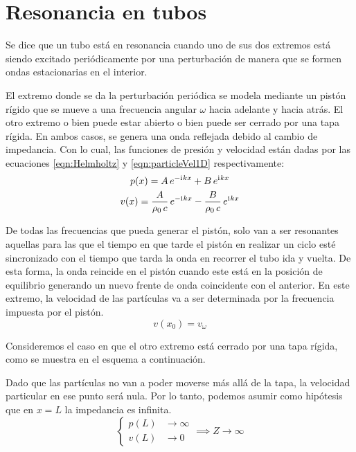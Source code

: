 \documentclass[a5paper,12pt,twoside]{book}
\begin{document}
\section{Resonancia en tubos}

Se dice que un tubo está en resonancia cuando uno de sus dos extremos está siendo excitado periódicamente por una perturbación de manera que se formen ondas estacionarias en el interior.

El extremo donde se da la perturbación periódica se modela mediante un pistón rígido que se mueve a una frecuencia angular $\omega$ hacia adelante y hacia atrás. El otro extremo o bien puede estar abierto o bien puede ser cerrado por una tapa rígida. En ambos casos, se genera una onda reflejada debido al cambio de impedancia. Con lo cual, las funciones de presión y velocidad están dadas por las ecuaciones \ref{eqn:Helmholtz} y \ref{eqn:particleVel1D} respectivamente:
\begin{gather}
    p(x) = A \, e^{-\mathrm{i}\mkern1mu k x} + B \, e^{\mathrm{i}\mkern1mu k x}
    \label{eqn:tubePressure}
    \\
    v(x) = \frac{A}{\rho_0 \, c} \, e^{-\mathrm{i}\mkern1mu k x} - \frac{B}{\rho_0 \, c} \, e^{\mathrm{i}\mkern1mu k x}
    \label{eqn:tubeVelocity}
\end{gather}

De todas las frecuencias que pueda generar el pistón, solo van a ser resonantes aquellas para las que el tiempo en que tarde el pistón en realizar un ciclo esté sincronizado con el tiempo que tarda la onda en recorrer el tubo ida y vuelta. De esta forma, la onda reincide en el pistón cuando este está en la posición de equilibrio generando un nuevo frente de onda coincidente con el anterior. En este extremo, la velocidad de las partículas va a ser determinada por la frecuencia impuesta por el pistón.
\begin{equation}
    v(x_0) = v_\omega
    \label{eqn:tubeV0}
\end{equation}

Consideremos el caso en que el otro extremo está cerrado por una tapa rígida, como se muestra en el esquema a continuación.

\begin{center}
    \def\svgwidth{0.6\linewidth}
    
\end{center}

Dado que las partículas no van a poder moverse más allá de la tapa, la velocidad particular en ese punto será nula. Por lo tanto, podemos asumir como hipótesis que en $x=L$ la impedancia es infinita.
\begin{equation*}
    \left\{
    \begin{aligned}
        p(L) &\to \infty
        \\
        v(L) &\to 0
    \end{aligned}
    \right.
    \implies
    Z \to \infty
\end{equation*}
\end{document}
